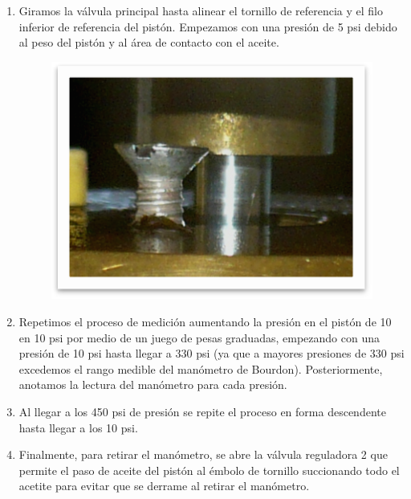 \documentclass[a4paper,12pt]{report}
\begin{document}
\begin{enumerate}
\begin{figure}[H]
\end{figure}
\item Giramos la válvula principal hasta alinear el tornillo de referencia y el filo inferior de referencia del pistón. Empezamos con una presión de 5 psi debido al peso del pistón y al área de contacto con el aceite.
\begin{figure}[H]
\centering
\includegraphics[scale=0.55]{proc5.png}
\end{figure}
\item Repetimos el proceso de medición aumentando la presión en el pistón de 10 en 10 psi por medio de un juego de pesas graduadas, empezando con una presión de 10 psi hasta llegar a 330 psi (ya que a mayores presiones de 330 psi excedemos el rango medible del manómetro de Bourdon). Posteriormente, anotamos la lectura del manómetro para cada presión.
\item Al llegar a los 450 psi de presión se repite el proceso en forma descendente hasta llegar a los 10 psi. 
\item Finalmente, para retirar el manómetro, se abre la válvula reguladora 2 que permite el paso de aceite del pistón al émbolo de tornillo succionando todo el acetite para evitar que se derrame al retirar el manómetro.
\end{enumerate}
\end{document}
